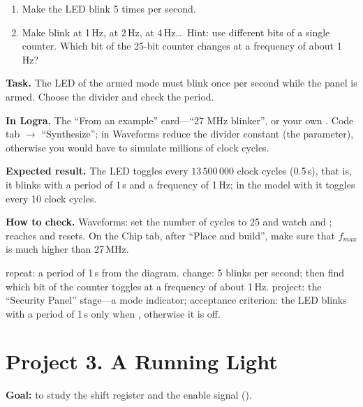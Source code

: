 \begin{taskbox}
\begin{enumerate}
  \item Make the LED blink 5 times per second.
  \item Make  blink at 1\,Hz,  at 2\,Hz,
         at 4\,Hz\ldots\ Hint: use different bits of a single
        counter. Which bit of the 25-bit counter changes at a frequency of about 1\,Hz?
\end{enumerate}
\end{taskbox}

\begin{diybox}
\textbf{Task.} The LED of the armed mode must blink once per second while the panel is armed. Choose the divider and check the period.

\textbf{In Logra.} The ``From an example'' card---``27 MHz blinker'', or your own . Code tab $\to$ ``Synthesize''; in Waveforms reduce the divider constant (the  parameter), otherwise you would have to simulate millions of clock cycles.

\textbf{Expected result.} The LED toggles every $13\,500\,000$ clock cycles (0.5\,s), that is, it blinks with a period of 1\,s and a frequency of 1\,Hz; in the model with  it toggles every 10 clock cycles.

\textbf{How to check.} Waveforms: set the number of cycles to 25 and watch  and ;  reaches  and resets. On the Chip tab, after ``Place and build'', make sure that $f_{max}$ is much higher than 27\,MHz.

 repeat: a period of 1\,s from the diagram.  change: 5 blinks per second; then find which bit of the counter toggles at a frequency of about 1\,Hz.  project: the ``Security Panel'' stage---a mode indicator; acceptance criterion: the LED blinks with a period of 1\,s only when , otherwise it is off.
\end{diybox}

\section{Project 3. A Running Light}

\textbf{Goal:} to study the shift register and the enable signal ().

